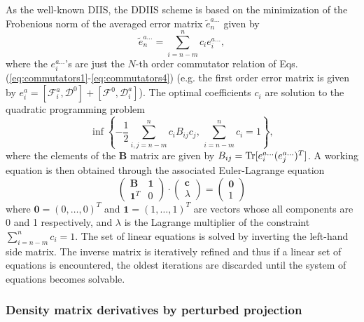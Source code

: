 \documentclass[prl,aps,twocolumn,showpacs,twocolumngrid,superbib]{revtex4}
\def\Tr{{\rm Tr}}
\def\F{\mathcal{F}}
\def\D{\mathcal{D}}
\begin{document}
As the well-known DIIS, the DDIIS scheme is based on the 
minimization of the Frobenious norm of the averaged error 
matrix $\widetilde e_n^{a\ldots}$ given by
\begin{equation}
  \widetilde e_n^{a\ldots}=\sum_{i=n-m}^{n}c_i e_i^{a\ldots},
\end{equation}
where the $e_i^{a\ldots}$'s are just the $N$-th order commutator relation
of Eqs. (\ref{eq:commutators1}-\ref{eq:commutators4}) (e.g. the first order error matrix 
is given by $e_i^{a}=[\F^{a}_i ,\D^{0}]+[\F^{0},\D^{a}_i]$).
The optimal coefficients $c_i$ are solution to the 
quadratic programming problem
\begin{equation}
  \inf \left \{-\frac{1}{2}\sum_{i,j=n-m}^nc_iB_{ij}c_j,\, \sum_{i=n-m}^n c_i=1 \right \},
\end{equation}
where the elements of the $\mathbf{B}$ matrix are given by 
$B_{ij}=\Tr[e_i^{a\ldots}(e_j^{a\ldots})^T]$.
A working equation is then obtained through the associated Euler-Lagrange equation
\begin{equation}\label{eq:diismatrix}
 \left ( \begin{array}{cc}
     \mathbf{B}     & \mathbf{1} \\
     \mathbf{1}^{T} & 0 
   \end{array}\right )
 \cdot \left ( \begin{array}{c}
     \mathbf{c}     \\
     \lambda  
   \end{array}\right )
  =  \left ( \begin{array}{c}
     \mathbf{0}      \\
         1  
   \end{array}\right )
\end{equation}
 where $\mathbf{0}=(0,\ldots,0)^{T}$ and $\mathbf{1}=(1,\ldots,1)^{T}$ are
 vectors whose all components are 0 and 1 respectively, 
 and $\lambda$ is the Lagrange multiplier of the constraint 
 $\sum_{i=n-m}^{n}c_{i}=1$. The set of linear equations is solved
 by inverting the left-hand side matrix. The inverse matrix is iteratively 
 refined and thus if a linear set of equations is encountered, the oldest
 iterations are discarded until the system of equations becomes solvable.

\subsubsection{Density matrix derivatives by perturbed projection}
\end{document}
